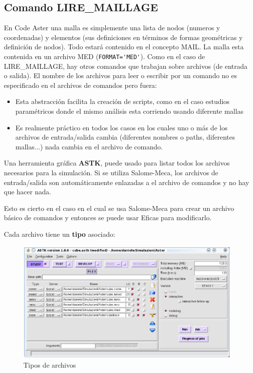 \documentclass[12pt]{book}
\theoremstyle{definition}
\theoremstyle{remark}
\theoremstyle{plain}
\begin{document}
\subsection{Comando LIRE\_MAILLAGE}
En Code Aster una malla es simplemente una lista de nodos (numeros y coordenadas)
y elementos (sus definiciones en términos de formas geométricas y definición 
de nodos). Todo estará contenido en el concepto MAIL. La malla esta contenida
en un archivo MED (\verb*|FORMAT='MED'|). Como en el caso de LIRE\_MAILLAGE, hay 
otros comandos que trabajan sobre archivos (de entrada o salida). El nombre
de los archivos para leer o escribir por un comando no es especificado en el archivos
de comandos pero fuera:
\begin{itemize}
 \item Esta abstracción facilita la creación de scripts, como en el caso estudios 
paramétricos donde el mismo análisis esta corriendo usando diferente mallas
 \item Es realmente práctico en todos los casos en los cuales uno o más de los 
archivos de entrada/salida cambia (diferentes nombres o paths, diferentes mallas...)
nada cambia en el archivo de comando.
\end{itemize}

Una herramienta gráfica \textbf{ASTK}, puede usado para listar todos los archivos 
necesarios para la simulación.
Si se utiliza Salome-Meca, los archivos de entrada/salida son automáticamente 
enlazadas a el archivo de comandos y no hay que hacer nada.

Esto es cierto en el caso en el cual se usa Salome-Meca para crear un archivo 
básico de comandos y entonces se puede usar Eficas para modificarlo.

Cada archivo tiene un \textbf{tipo} asociado:

\begin{figure}
\centering
\includegraphics[width=5in]{tipos.png}
\caption{Tipos de archivos}
\label{fig4}
\end{figure}
\end{document}
